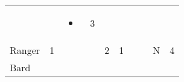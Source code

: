 \documentclass[12pt]{article}
\begin{document}
\begin{longtable}[]{@{}llllllllll@{}}
\begin{minipage}[t]{0.06\columnwidth}
\strut\end{minipage} &
\begin{minipage}[t]{0.06\columnwidth}\raggedright\strut
\strut\end{minipage} &
\begin{minipage}[t]{0.07\columnwidth}\raggedright\strut
\begin{itemize}
\item
\end{itemize}
\strut\end{minipage} &
\begin{minipage}[t]{0.08\columnwidth}\raggedright\strut
3
\strut\end{minipage}\tabularnewline
\begin{minipage}[t]{0.13\columnwidth}\raggedright\strut
Ranger
\strut\end{minipage} &
\begin{minipage}[t]{0.06\columnwidth}\raggedright\strut
1
\strut\end{minipage} &
\begin{minipage}[t]{0.06\columnwidth}\raggedright\strut
\strut\end{minipage} &
\begin{minipage}[t]{0.06\columnwidth}\raggedright\strut
\strut\end{minipage} &
\begin{minipage}[t]{0.06\columnwidth}\raggedright\strut
2
\strut\end{minipage} &
\begin{minipage}[t]{0.06\columnwidth}\raggedright\strut
1
\strut\end{minipage} &
\begin{minipage}[t]{0.06\columnwidth}\raggedright\strut
\strut\end{minipage} &
\begin{minipage}[t]{0.06\columnwidth}\raggedright\strut
\strut\end{minipage} &
\begin{minipage}[t]{0.07\columnwidth}\raggedright\strut
N
\strut\end{minipage} &
\begin{minipage}[t]{0.08\columnwidth}\raggedright\strut
4
\strut\end{minipage}\tabularnewline
\begin{minipage}[t]{0.13\columnwidth}\raggedright\strut
Bard
\strut\end{minipage} &
\begin{minipage}[t]{0.06\columnwidth}\raggedright\strut
\strut\end{minipage} &

\end{longtable}
\end{document}

